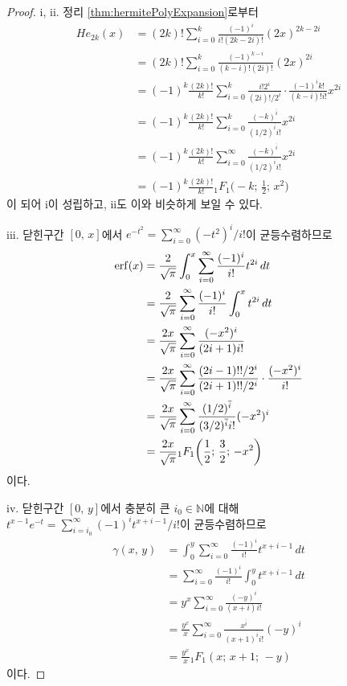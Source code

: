 \begin{proof}
    i, ii. 정리 \ref{thm:hermitePolyExpansion}로부터
    \begin{align*}
        He_{2k}(x)&=(2k)!\sum_{i=0}^k\frac{(-1)^i}{i!(2k-2i)!}(2x)^{2k-2i}\\
        &=(2k)!\sum_{i=0}^k\frac{(-1)^{k-i}}{(k-i)!(2i)!}(2x)^{2i}\\
        &=(-1)^k\frac{(2k)!}{k!}\sum_{i=0}^k\frac{i!2^i}{(2i)!/2^i}\cdot\frac{(-1)^ik!}{(k-i)!i!}x^{2i}\\
        &=(-1)^k\frac{(2k)!}{k!}\sum_{i=0}^k\frac{(-k)^{\overline{i}}}{(1/2)^{\overline{i}}i!}x^{2i}\\
        &=(-1)^k\frac{(2k)!}{k!}\sum_{i=0}^\infty\frac{(-k)^{\overline{i}}}{(1/2)^{\overline{i}}i!}x^{2i}\\
        &=(-1)^k\frac{(2k)!}{k!}{}_1F_1\bigg(-k;\,\frac{1}{2};\,x^2\bigg)
    \end{align*}
    이 되어 i이 성립하고, ii도 이와 비슷하게 보일 수 있다.

    iii. 닫힌구간 $[0,\,x]$에서 $e^{-t^2}=\sum_{i=0}^\infty(-t^2)^i/i!$이 균등수렴하므로
    \begin{align*}
        \mathrm{erf}(x)&=\frac{2}{\sqrt{\pi}}\int_0^x\sum_{i=0}^\infty\frac{(-1)^i}{i!}t^{2i}\,dt\\
        &=\frac{2}{\sqrt{\pi}}\sum_{i=0}^\infty\frac{(-1)^i}{i!}\int_0^xt^{2i}\,dt\\
        &=\frac{2x}{\sqrt{\pi}}\sum_{i=0}^\infty\frac{(-x^2)^{i}}{(2i+1)i!}\\
        &=\frac{2x}{\sqrt{\pi}}\sum_{i=0}^\infty\frac{(2i-1)!!/2^i}{(2i+1)!!/2^i}\cdot\frac{(-x^2)^{i}}{i!}\\
        &=\frac{2x}{\sqrt{\pi}}\sum_{i=0}^\infty\frac{(1/2)^{\overline{i}}}{(3/2)^{\overline{i}}i!}(-x^2)^{i}\\
        &=\frac{2x}{\sqrt{\pi}}{}_1F_1\bigg(\dfrac{1}{2};\,\dfrac{3}{2};\,-x^2\bigg)
    \end{align*}
    이다.

    iv. 닫힌구간 $[0,\,y]$에서 충분히 큰 $i_0\in\mathbb{N}$에 대해 $t^{x-1}e^{-t}=\sum_{i=i_0}^\infty(-1)^it^{x+i-1}/i!$이 균등수렴하므로
    \begin{align*}
        \gamma(x,\,y)&=\int_0^y\sum_{i=0}^\infty\frac{(-1)^i}{i!}t^{x+i-1}\,dt\\
        &=\sum_{i=0}^\infty\frac{(-1)^i}{i!}\int_0^yt^{x+i-1}\,dt\\
        &=y^x\sum_{i=0}^\infty\frac{(-y)^i}{(x+i)i!}\\
        &=\frac{y^x}{x}\sum_{i=0}^\infty\frac{x^{\overline{i}}}{(x+1)^{\overline{i}}i!}(-y)^i\\
        &=\frac{y^x}{x}{}_1F_1(x;\,x+1;\,-y)
    \end{align*}
    이다.


\end{proof}
